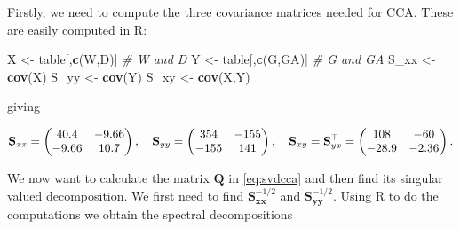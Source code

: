 \documentclass[
]{book}
\newenvironment{Shaded}{\begin{snugshade}}{\end{snugshade}}
\newcommand{\CommentTok}[1]{\textcolor[rgb]{0.56,0.35,0.01}{\textit{#1}}}
\newcommand{\DecValTok}[1]{\textcolor[rgb]{0.00,0.00,0.81}{#1}}
\newcommand{\FunctionTok}[1]{\textcolor[rgb]{0.13,0.29,0.53}{\textbf{#1}}}
\newcommand{\NormalTok}[1]{#1}
\newcommand{\OtherTok}[1]{\textcolor[rgb]{0.56,0.35,0.01}{#1}}
\newcommand{\SpecialCharTok}[1]{\textcolor[rgb]{0.81,0.36,0.00}{\textbf{#1}}}
\newcommand{\StringTok}[1]{\textcolor[rgb]{0.31,0.60,0.02}{#1}}
\theoremstyle{definition}
\theoremstyle{definition}
\theoremstyle{definition}
\theoremstyle{definition}
\theoremstyle{remark}
\begin{document}
Firstly, we need to compute the three covariance matrices needed for CCA. These are easily computed in R:

\begin{Shaded}
\begin{Highlighting}[]
\NormalTok{X }\OtherTok{\textless{}{-}}\NormalTok{ table[,}\FunctionTok{c}\NormalTok{(}\StringTok{\textquotesingle{}W\textquotesingle{}}\NormalTok{,}\StringTok{\textquotesingle{}D\textquotesingle{}}\NormalTok{)] }\CommentTok{\# W and D}
\NormalTok{Y }\OtherTok{\textless{}{-}}\NormalTok{ table[,}\FunctionTok{c}\NormalTok{(}\StringTok{\textquotesingle{}G\textquotesingle{}}\NormalTok{,}\StringTok{\textquotesingle{}GA\textquotesingle{}}\NormalTok{)] }\CommentTok{\# G and GA}
\NormalTok{S\_xx }\OtherTok{\textless{}{-}} \FunctionTok{cov}\NormalTok{(X)}
\NormalTok{S\_yy }\OtherTok{\textless{}{-}} \FunctionTok{cov}\NormalTok{(Y)}
\NormalTok{S\_xy }\OtherTok{\textless{}{-}} \FunctionTok{cov}\NormalTok{(X,Y)}
\end{Highlighting}
\end{Shaded}

giving

\[\mathbf S_{xx} =\begin{pmatrix}40.4&-9.66 \\-9.66&10.7 \\\end{pmatrix}, \quad \mathbf S_{yy} =\begin{pmatrix}354&-155 \\-155&141 \\\end{pmatrix}, \\
\quad \mathbf S_{xy}=\mathbf S_{yx}^\top =\begin{pmatrix}108&-60 \\-28.9&-2.36 \\\end{pmatrix}.\]

We now want to calculate the matrix \(\mathbf Q\) in \eqref{eq:svdcca} and then find its singular valued decomposition. We first need to find \(\mathbf S_{\mathbf x\mathbf x}^{-1/2}\) and \(\mathbf S_{\mathbf y\mathbf y}^{-1/2}\). Using R to do the computations we obtain the spectral decompositions

\begin{Shaded}
\end{Shaded}
\end{document}
